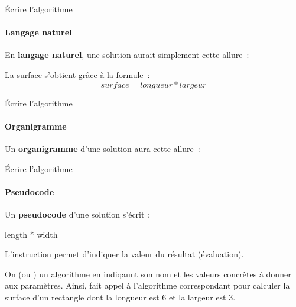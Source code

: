 \begin{hideedit}
\begin{frame}{Écrire l'algorithme}
  \framesubtitle{Langage naturel}

  En \textbf{langage naturel}, une solution aurait simplement cette
  allure~:

  \begin{langagenaturel}
    La surface s'obtient grâce à la formule~:
    \[
      surface = longueur * largeur
    \]
  \end{langagenaturel}
\end{frame}

\begin{frame}{Écrire l'algorithme}
  \framesubtitle{Organigramme}

  Un \textbf{organigramme} d'une solution aura cette allure~:

  \begin{center}
    \footnotesize
  \end{center}
\end{frame}

\begin{frame}{Écrire l'algorithme}
  \framesubtitle{Pseudocode}

  Un \textbf{pseudocode} d'une solution s’écrit :

  \begin{pseudocode}
            \Return length * width
    \EndAlgo
  \end{pseudocode}

  L'instruction  permet d'indiquer la valeur du résultat
  (évaluation).

  On  (ou ) un algorithme en indiqaunt
  son nom et les valeurs concrètes à donner aux paramètres.
  Ainsi,
   fait appel à l’algorithme correspondant
  pour calculer la surface d’un rectangle dont la longueur est $6$ et
  la largeur est $3$.
\end{frame}
\end{hideedit}
